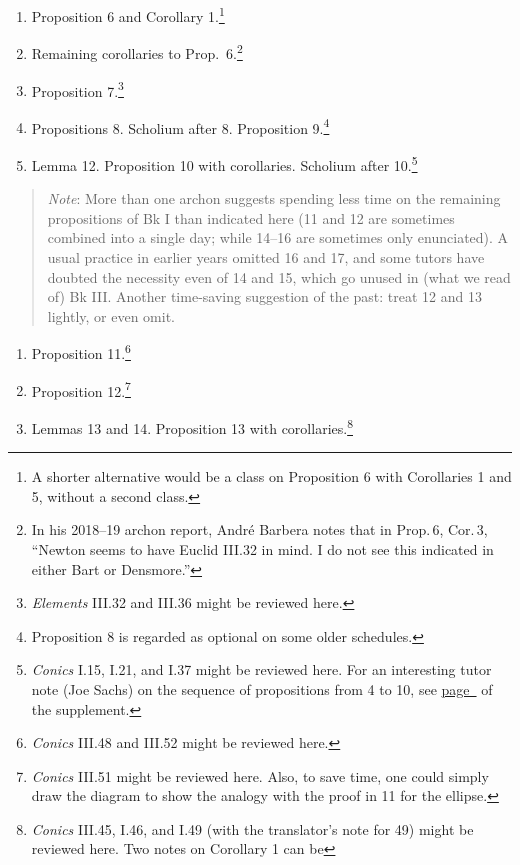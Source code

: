\documentclass[10pt]{article}
\begin{document}
{\begin{enumerate}[resume*]
		5.\footnote{This proposition is regarded as
			optional on some older schedules.}
	\item Proposition 6 and Corollary 1.\footnote{A
			shorter alternative would be
			a class on Proposition 6 with Corollaries 1 and
			5, without a second class.}  \item
		Remaining corollaries to Prop.~6.\footnote{In his 2018--19 archon report, Andr\'e Barbera notes that in Prop.\,6, Cor.\,3, ``Newton seems to have Euclid III.32 in mind. I do not see
		this indicated in either Bart or Densmore.''}
		  \item
		Proposition 7.\footnote{\emph{Elements}
			III.32 and III.36 might be reviewed
			here.} \item Propositions 8.
		Scholium after 8. Proposition
		9.\footnote{Proposition 8 is regarded as
			optional on some older schedules.}
	\item Lemma 12. Proposition 10 with corollaries.
		Scholium after 10.\footnote{\emph{Conics}
			I.15, I.21, and I.37 might be
			reviewed here. For an interesting
			tutor note (Joe Sachs) on the
			sequence of propositions from 4 to
			10, see
			\hyperref[supple.77]{page~\pageref{supple.77}}
			of the supplement.} \end{enumerate}
			\vspace{-0.5em}
\begin{quote} \small{\emph{Note}: More than one archon
		suggests spending less time on the remaining
		propositions of Bk I than indicated here (11
		and 12 are sometimes combined into a single
		day; while 14–16 are sometimes only
		enunciated). A usual practice in earlier
		years omitted 16 and 17, and some tutors
		have doubted the necessity even of 14 and
		15, which go unused in (what we read of) Bk
		III. Another time-saving suggestion of the
		past: treat 12 and 13 lightly, or even
		omit.}  \end{quote}
\begin{enumerate}[resume*] \item Proposition
		11.\footnote{\emph{Conics} III.48 and III.52
			might be reviewed here.} \item
		Proposition 12.\footnote{\emph{Conics}
			III.51 might be reviewed here. Also,
			to save time, one could simply draw
			the diagram to show the analogy with
			the proof in 11 for the ellipse.}
	\item Lemmas 13 and 14. Proposition 13 with
		corollaries.\footnote{\emph{Conics} III.45,
			I.46, and I.49 (with the
			translator's note for 49) might be
			reviewed here. Two notes on Corollary 1 can be
}
\end{enumerate}}
\end{document}
